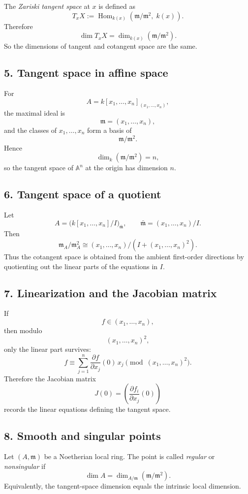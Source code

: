 \documentclass[12pt,a4paper]{article}
\theoremstyle{plain}
\theoremstyle{definition}      %
\begin{document}
	The \emph{Zariski tangent space} at \(x\) is defined as
	\[
	T_xX:=\operatorname{Hom}_{k(x)}(\mathfrak m/\mathfrak m^2,\;k(x)).
	\]
	Therefore
	\[
	\dim T_xX=\dim_{k(x)}(\mathfrak m/\mathfrak m^2).
	\]
	So the dimensions of tangent and cotangent space are the same.
	
	\subsection*{5. Tangent space in affine space}
	
	For
	\[
	A=k[x_1,\dots,x_n]_{(x_1,\dots,x_n)},
	\]
	the maximal ideal is
	\[
	\mathfrak m=(x_1,\dots,x_n),
	\]
	and the classes of \(x_1,\dots,x_n\) form a basis of
	\[
	\mathfrak m/\mathfrak m^2.
	\]
	Hence
	\[
	\dim_k(\mathfrak m/\mathfrak m^2)=n,
	\]
	so the tangent space of \(\mathbb A^n\) at the origin has dimension \(n\).
	
	\subsection*{6. Tangent space of a quotient}
	
	Let
	\[
	A=\bigl(k[x_1,\dots,x_n]/I\bigr)_{\bar{\mathfrak m}},
	\qquad
	\bar{\mathfrak m}=(x_1,\dots,x_n)/I.
	\]
	Then
	\[
	\mathfrak m_A/\mathfrak m_A^2
	\cong
	(x_1,\dots,x_n)/(I+(x_1,\dots,x_n)^2).
	\]
	Thus the cotangent space is obtained from the ambient first-order directions by quotienting out the linear parts of the equations in \(I\).
	
	\subsection*{7. Linearization and the Jacobian matrix}
	
	If
	\[
	f\in (x_1,\dots,x_n),
	\]
	then modulo
	\[
	(x_1,\dots,x_n)^2,
	\]
	only the linear part survives:
	\[
	f \equiv \sum_{j=1}^n \frac{\partial f}{\partial x_j}(0)\,x_j
	\pmod{(x_1,\dots,x_n)^2}.
	\]
	Therefore the Jacobian matrix
	\[
	J(0)=\left(\frac{\partial f_i}{\partial x_j}(0)\right)
	\]
	records the linear equations defining the tangent space.
	
	\subsection*{8. Smooth and singular points}
	
	Let \((A,\mathfrak m)\) be a Noetherian local ring. The point is called \emph{regular} or \emph{nonsingular} if
	\[
	\dim A=\dim_{A/\mathfrak m}(\mathfrak m/\mathfrak m^2).
	\]
	Equivalently, the tangent-space dimension equals the intrinsic local dimension.
	
\end{document}
